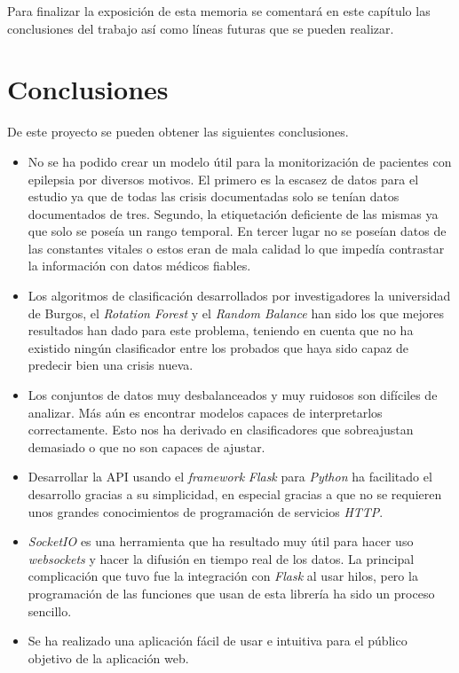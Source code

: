
Para finalizar la exposición de esta memoria se comentará en este capítulo las conclusiones del trabajo así como líneas futuras que se pueden realizar.

\section{Conclusiones}
De este proyecto se pueden obtener las siguientes conclusiones.
\begin{itemize}
	\item No se ha podido crear un modelo útil para la monitorización de pacientes con epilepsia por diversos motivos. El primero es la escasez de datos para el estudio ya que de todas las crisis documentadas solo se tenían datos documentados de tres. Segundo, la etiquetación deficiente de las mismas ya que solo se poseía un rango temporal. En tercer lugar no se poseían datos de las constantes vitales o estos eran de mala calidad lo que impedía contrastar la información con datos médicos fiables.
	\item Los algoritmos de clasificación desarrollados por investigadores la universidad de Burgos, el \textit{Rotation Forest} y el \textit{Random Balance} han sido los que mejores resultados han dado para este problema, teniendo en cuenta que no ha existido ningún clasificador entre los probados que haya sido capaz de predecir bien una crisis nueva.
	\item Los conjuntos de datos muy desbalanceados y muy ruidosos son difíciles de analizar. Más aún es encontrar modelos capaces de interpretarlos correctamente. Esto nos ha derivado en clasificadores que sobreajustan demasiado o que no son capaces de ajustar.
	\item Desarrollar la API usando el \textit{framework} \textit{Flask} para \textit{Python} ha facilitado el desarrollo gracias a su simplicidad, en especial gracias a que no se requieren unos grandes conocimientos de programación de servicios \textit{HTTP}.
	\item \textit{SocketIO} es una herramienta que ha resultado muy útil para hacer uso \textit{websockets} y hacer la difusión en tiempo real de los datos. La principal complicación que tuvo fue la integración con \textit{Flask} al usar hilos, pero la programación de las funciones que usan de esta librería ha sido un proceso sencillo. 
	\item Se ha realizado una aplicación fácil de usar e intuitiva para el público objetivo de la aplicación web.
\end{itemize}

